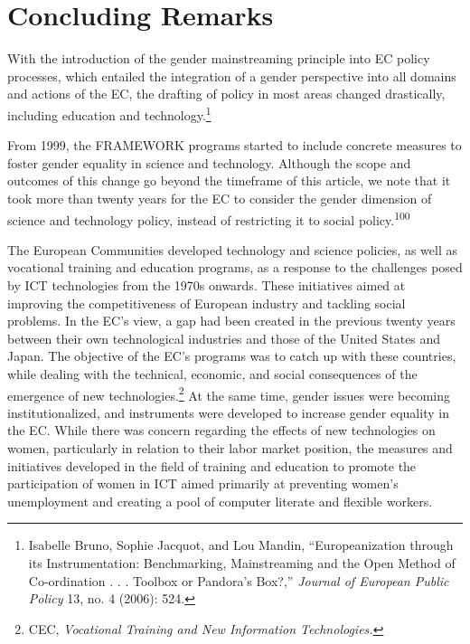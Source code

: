 \documentclass{tufte-handout}
\begin{document}
\hypertarget{concluding-remarks}{%
\section{Concluding Remarks}\label{concluding-remarks}}

With the introduction of the gender mainstreaming principle into EC
policy processes, which entailed the integration of a gender perspective
into all domains and actions of the EC, the drafting of policy in most
areas changed drastically, including education and
technology.\footnote{Isabelle Bruno, Sophie Jacquot, and Lou Mandin,
  ``Europeanization through its Instrumentation: Benchmarking,
  Mainstreaming and the Open Method of Co-ordination . . . Toolbox or
  Pandora's Box?,'' \emph{Journal of European Public Policy} 13, no. 4
  (2006): 524.}

From 1999, the FRAMEWORK programs started to include concrete measures
to foster gender equality in science and technology. Although the scope
and outcomes of this change go beyond the timeframe of this article, we
note that it took more than twenty years for the EC to consider the
gender dimension of science and technology policy, instead of
restricting it to social policy.\textsuperscript{100} 

\newpage The European Communities developed technology and science policies, as
well as vocational training and education programs, as a response to the
challenges posed by ICT technologies from the 1970s onwards. These
initiatives aimed at improving the competitiveness of European industry
and tackling social problems. In the EC's view, a gap had been created
in the previous twenty years between their own technological industries
and those of the United States and Japan. The objective of the EC's
programs was to catch up with these countries, while dealing with the
technical, economic, and social consequences of the emergence of new
technologies.\footnote{CEC, \emph{Vocational Training and New
  Information Technologies.}} At the same time, gender issues were
becoming institutionalized, and instruments were developed to increase
gender equality in the EC. While there was concern regarding the effects
of new technologies on women, particularly in relation to their labor
market position, the measures and initiatives developed in the field of
training and education to promote the participation of women in ICT
aimed primarily at preventing women's unemployment and creating a pool
of computer literate and flexible workers.
\end{document}
